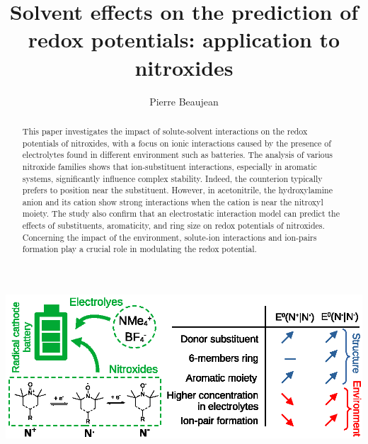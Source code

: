 \documentclass[review,preprint]{elsarticle}
\begin{document}
	
	\begin{frontmatter}
		
		
		\title{Solvent effects on the prediction of redox potentials: application to nitroxides}
		
		\author[1]{Pierre Beaujean}
		
		
		
		
		\begin{abstract}
			This paper investigates the impact of solute-solvent interactions on the redox potentials of nitroxides, with a focus on ionic interactions caused by the presence of electrolytes found in different environment such as batteries. The analysis of various nitroxide families shows that ion-substituent interactions, especially in aromatic systems, significantly influence complex stability. Indeed, the counterion typically prefers to position near the substituent. However, in acetonitrile, the hydroxylamine anion and its cation show strong interactions when the cation is near the nitroxyl moiety. The study also confirm that an electrostatic interaction model can predict the effects of substituents, aromaticity, and ring size on redox potentials of nitroxides. Concerning the impact of the environment, solute-ion interactions  and ion-pairs formation play a crucial role in modulating the redox potential.
		\end{abstract}
		
		
		\begin{graphicalabstract}
			\includegraphics{Graphical_Abstract}
		\end{graphicalabstract}
		

\end{frontmatter}
\end{document}
